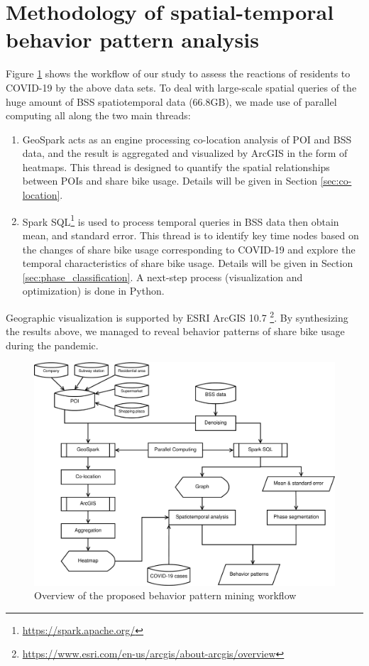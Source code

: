 \documentclass[ijgi,submit,moreauthors,pdftex]{Definitions/mdpi}
\begin{document}
\section{Methodology of spatial-temporal behavior pattern analysis}\label{sec:method}

Figure \ref{fig:diagram} shows the workflow of our study to assess the reactions of residents to COVID-19 by the above data sets.
To deal with large-scale spatial queries of the huge amount of BSS spatiotemporal data (66.8GB), we made use of parallel computing all along the two main threads:
\begin{enumerate}
    \item GeoSpark \cite{huang2017geospark} acts as an engine processing co-location analysis of POI and BSS data, and the result is aggregated and visualized by ArcGIS in the form of heatmaps.
    This thread is designed to quantify the spatial relationships between POIs and share bike usage. 
    Details will be given in Section \ref{sec:co-location}.
    \item Spark SQL\footnote{\url{https://spark.apache.org/}} is used to process temporal queries in BSS data then obtain mean, and standard error.
    This thread is to identify key time nodes based on the changes of share bike usage corresponding to COVID-19 and explore the temporal characteristics of share bike usage. 
    Details will be given in Section \ref{sec:phase_classification}.
    A next-step process (visualization and optimization) is done in Python.
\end{enumerate}
Geographic visualization is supported by ESRI ArcGIS 10.7 \footnote{\url{https://www.esri.com/en-us/arcgis/about-arcgis/overview}}.
By synthesizing the results above, we managed to reveal behavior patterns of share bike usage during the pandemic.

\begin{figure}[ht]
    \centering
    \includegraphics[width=.8\textwidth]{diagram.pdf}
    \caption{Overview of the proposed behavior pattern mining workflow}
    \label{fig:diagram}
\end{figure}
\end{document}

